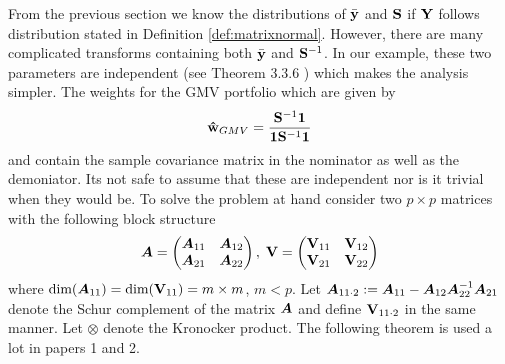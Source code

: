 \documentclass[oneside]{book}\usepackage{knitr}
\begin{document}
From the previous section we know the distributions of $\bar{\mathbf{y}}$ and $\mathbf{S}$ if $\mathbf{Y}$ follows distribution stated in Definition \ref{def:matrixnormal}. 
However, there are many complicated transforms containing both $\bar{\mathbf{y}}$ and $\mathbf{S}^{-1}$.
In our example, these two parameters are independent (see Theorem 3.3.6 \citet{GuptaNagar2000}) which makes the analysis simpler.
The weights for the GMV portfolio which are given by
$$
\mathbf{\hat{w}}_{GMV}=\frac{\mathbf{S}^{-1}\mathbf{1}}{\mathbf{1}\mathbf{S}^{-1}\mathbf{1}}
$$
and contain the sample covariance matrix in the nominator as well as the demoniator.
Its not safe to assume that these are independent nor is it trivial when they would be.
To solve the problem at hand consider two $p\times p$ matrices with the following block structure 
\begin{equation}\label{eqn:blockmat}
\mbox{\boldmath$A$} = \begin{pmatrix}
       \mbox{\boldmath$A$}_{11} & \mbox{\boldmath$A$}_{12} \\
       \mbox{\boldmath$A$}_{21} & \mbox{\boldmath$A$}_{22}
      \end{pmatrix},\;
\mathbf{V} = \begin{pmatrix}
           \mathbf{V}_{11} & \mathbf{V}_{12} \\
           \mathbf{V}_{21} & \mathbf{V}_{22}
          \end{pmatrix}
\end{equation}
where $\text{dim}(\mbox{\boldmath$A$}_{11}) = \text{dim}(\mathbf{V}_{11})= m \times m$, $m<p$. 
Let $\mbox{\boldmath$A$}_{11\cdot 2} := \mbox{\boldmath$A$}_{11} - \mbox{\boldmath$A$}_{12} \mbox{\boldmath$A$}_{22}^{-1} \mbox{\boldmath$A$}_{21}$ denote the Schur complement of the matrix $\mbox{\boldmath$A$}$ and define $\mathbf{V}_{11\cdot 2}$ in the same manner. 
Let $\otimes$ denote the Kronocker product. 
The following theorem is used a lot in papers 1 and 2.
\end{document}
